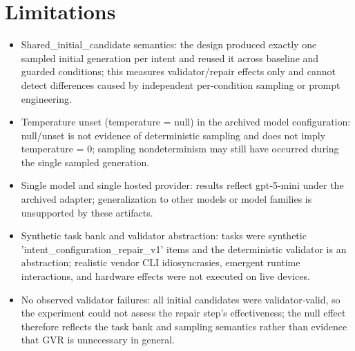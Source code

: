 \documentclass[conference]{IEEEtran}
\begin{document}
\section{Limitations}
\begin{itemize}
\item Shared\_initial\_candidate semantics: the design produced exactly one sampled initial generation per intent and reused it across baseline and guarded conditions; this measures validator/repair effects only and cannot detect differences caused by independent per‑condition sampling or prompt engineering.
\item Temperature unset (temperature = null) in the archived model configuration: null/unset is not evidence of deterministic sampling and does not imply temperature = 0; sampling nondeterminism may still have occurred during the single sampled generation.
\item Single model and single hosted provider: results reflect gpt‑5‑mini under the archived adapter; generalization to other models or model families is unsupported by these artifacts.
\item Synthetic task bank and validator abstraction: tasks were synthetic 'intent\_configuration\_repair\_v1' items and the deterministic validator is an abstraction; realistic vendor CLI idiosyncrasies, emergent runtime interactions, and hardware effects were not executed on live devices.
\item No observed validator failures: all initial candidates were validator‑valid, so the experiment could not assess the repair step's effectiveness; the null effect therefore reflects the task bank and sampling semantics rather than evidence that GVR is unnecessary in general.
\end{itemize}
\end{document}
